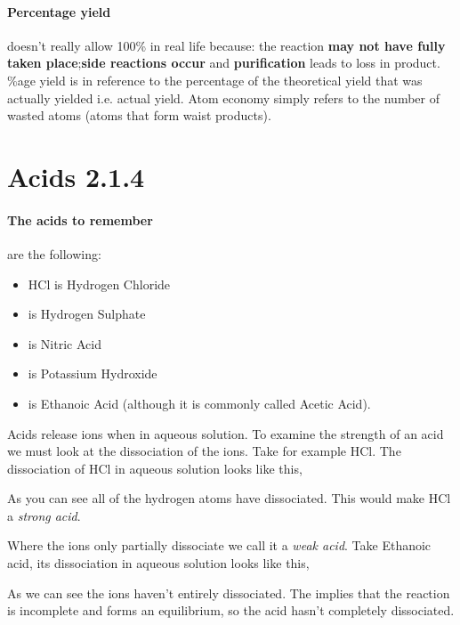 \paragraph{Percentage yield} doesn't really allow 100\% in real life because: the reaction \textbf{may not have fully taken place};\textbf{side reactions occur} and \textbf{purification} leads to loss in product.
\%age yield is in reference to the percentage of the theoretical yield that was actually yielded i.e. actual yield. Atom economy simply refers to the number of wasted atoms (atoms that form waist products).
\section{Acids 2.1.4}

	\paragraph{The acids to remember} are the following:
	\begin{itemize}
		\item HCl is Hydrogen Chloride
		\item {} is Hydrogen Sulphate
		\item {} is Nitric Acid
		\item {} is Potassium Hydroxide
		\item {} is Ethanoic Acid (although it is commonly called Acetic Acid).
	\end{itemize}
    Acids release  ions when in aqueous solution.
	To examine the strength of an acid we must look at the dissociation of the  ions.
	Take for example HCl. The dissociation of HCl in aqueous solution looks like this, 
	\begin{center}
	\end{center}
	As you can see all of the hydrogen atoms have dissociated.
	This would make HCl a \textit{strong acid}. 
	
	Where the  ions only partially dissociate we call it a \textit{weak acid}. Take Ethanoic acid, its dissociation in aqueous solution looks like this, 
	\begin{center}
	\end{center}
	 As we can see the  ions haven't entirely dissociated.
	 The \ch{<=>} implies that the reaction is incomplete and forms an equilibrium, so the acid hasn't completely dissociated.
	
